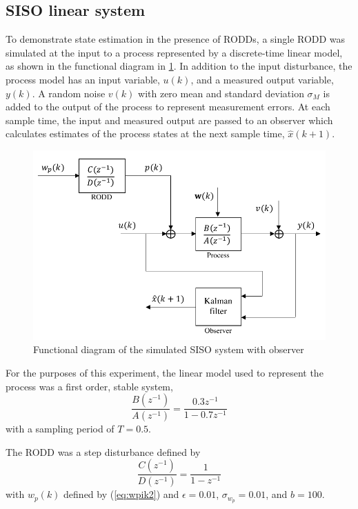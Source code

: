 \subsection{SISO linear system} \label{sim-obs-lin-1}

To demonstrate state estimation in the presence of RODDs, a single RODD was simulated at the input to a process represented by a discrete-time linear model, as shown in the functional diagram in \ref{fig:sim-sys-diag-siso}. In addition to the input disturbance, the process model has an input variable, $u(k)$, and a measured output variable, $y(k)$. A random noise $v(k)$ with zero mean and standard deviation $\sigma_M$ is added to the output of the process to represent measurement errors. At each sample time, the input and measured output are passed to an observer which calculates estimates of the process states at the next sample time, $\hat{x}(k+1)$.

\begin{figure}[htp]
	\centering
	\includegraphics[width=11.5cm]{images/sim-sys-diag-siso.pdf}
	\caption{Functional diagram of the simulated SISO system with observer}
	\label{fig:sim-sys-diag-siso}
\end{figure}

For the purposes of this experiment, the linear model used to represent the process was a first order, stable system,
\begin{equation}
	\frac{B(z^{-1})}{A(z^{-1})} = \frac{0.3z^{-1}}{1-0.7z^{-1}}
\end{equation}
with a sampling period of $T=0.5$.

The RODD was a step disturbance defined by
\begin{equation}
	\frac{C(z^{-1})}{D(z^{-1})} = \frac{1}{1-z^{-1}}
\end{equation}
with $w_p(k)$ defined by (\ref{eq:wpik2}) and $\epsilon=0.01$, $\sigma_{w_p}=0.01$, and $b=100$.

